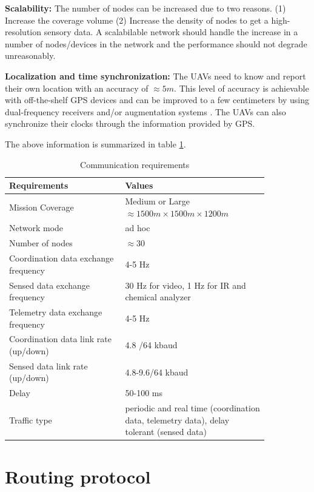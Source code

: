 \textbf{Scalability:} The number of nodes can be increased due to two reasons. (1) Increase the coverage volume (2) Increase the density of nodes to get a high-resolution sensory data. A scalabilable network  should handle the increase in a number of nodes/devices in the network and the performance should not degrade unreasonably. 

\textbf{Localization and time synchronization:} The UAVs need to know and report their own location with an accuracy of $\approx 5 m$. This level of accuracy is achievable with off-the-shelf GPS devices and can be improved to a few centimeters by using dual-frequency receivers and/or augmentation systems \cite{gps_accuracy} . The UAVs can also synchronize their clocks through the information provided by GPS.

The above information is summarized in table \ref{tab:communication_requirements}.
\begin{table}
\caption{Communication requirements}
\label{tab:communication_requirements}
\begin{tabular}{|p{0.38\linewidth}|p{0.47\linewidth}|}
\toprule
Requirements & Values\\
\midrule
Mission Coverage & Medium or Large $\approx 1500 m \times 1500 m \times 1200 m$ \\
\midrule
Network mode & ad hoc \\
\midrule
Number of nodes &  $\approx 30 $ \\
\midrule
Coordination data exchange frequency &  4-5 Hz \cite{7463007}\\
\midrule
Sensed data exchange frequency & 30 Hz for video, 1 Hz for IR and chemical analyzer \cite{7463007}\\
\midrule
Telemetry data exchange frequency & 4-5 Hz \cite{7463007}\\
\midrule
Coordination data link rate (up/down) & 4.8 /64 kbaud \cite{7463007} \\
\midrule
Sensed data link rate (up/down) & 4.8-9.6/64 kbaud \cite{NASA_UAV_mission_parameters} \\
\midrule
Delay & 50-100 ms \cite{7463007}\\
\midrule
Traffic type & periodic and real time (coordination data, telemetry data), delay tolerant (sensed data) \\
\bottomrule
\end{tabular}
\end{table}

\section{Routing protocol} 
\label{routing_protocol}

